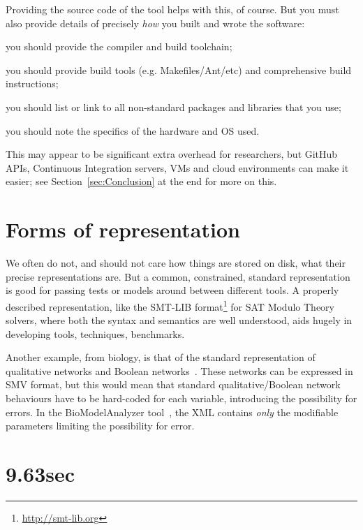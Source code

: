 \documentclass[10pt,conference,final]{IEEEtran}
\begin{document}
Providing the source code of the tool helps with this, of course. But
you must also provide details of precisely \emph{how} you built and
wrote the software:

\begin{compactitem}
\item you should provide the compiler and build toolchain; 
\item you should provide build tools (e.g. Makefiles/Ant/etc) and
  comprehensive build instructions; 
\item you should list or link to all non-standard packages and libraries that you use; 
\item you should note the specifics of the hardware and OS used. 
\end{compactitem}

This may appear to be significant extra overhead for researchers, but
GitHub APIs, Continuous Integration servers, VMs and cloud
environments can make it easier; see Section~\ref{sec:Conclusion} at
the end for more on this.


\section{Forms of representation}

We often do not, and should not care how things are stored on disk,
what their precise representations are. But a common, constrained, standard
representation is good for passing tests or models around between
different tools. A properly described representation, like the SMT-LIB
format\footnote{\url{http://smt-lib.org}} for SAT Modulo Theory
solvers, where both the syntax and semantics are well understood, aids
hugely in developing tools, techniques, benchmarks.

Another example, from biology, is that of the standard representation
of qualitative networks and Boolean
networks~\cite{Kauffman1969,Schaub2007}.  These networks can be
expressed in SMV format, but this would mean that standard
qualitative/Boolean network behaviours have to be hard-coded for each
variable, introducing the possibility for errors. In the
BioModelAnalyzer tool~\cite{Benque2012}, the XML contains \emph{only}
the modifiable parameters limiting the possibility for error.


\section{9.63sec} 
\end{document}
